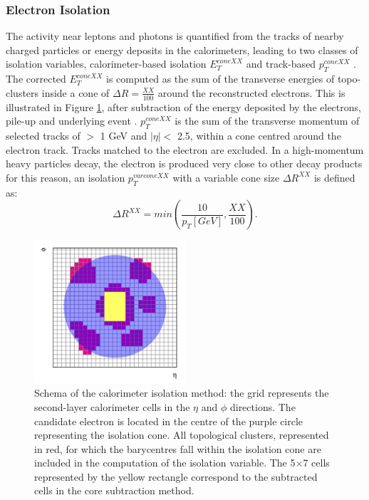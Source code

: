 \subsubsection{Electron Isolation}
\label{chap2:Objects:Egamma:EIso}
The activity near leptons and photons is quantified from the tracks of nearby charged particles or energy deposits in the calorimeters, leading to two classes of isolation variables, calorimeter-based isolation $E^{coneXX}_{T}$ and track-based $p_T^{coneXX}$ \cite{Electron_Reco_Id_Run1}. The corrected $E^{coneXX}_{T}$ is computed as the sum of the transverse energies of topo-clusters inside a cone of $\Delta R = \frac{XX}{100}$ around the reconstructed electrons. This is illustrated in Figure \ref{fig:chap2:Objects:Egamma:EIso:Schema}, after subtraction of the energy deposited by the electrons, pile-up and underlying event \cite{pile-up_IsoExtract}. $p_T^{coneXX}$ is the sum of the transverse momentum of selected tracks of \pT $>$ 1 GeV and $|\eta|<$ 2.5, within a cone centred around the electron track. Tracks matched to the electron are excluded. In a high-momentum heavy particles decay, the electron is produced very close to other decay products for this reason, an isolation $p_T^{varconeXX}$ with a variable cone size $\Delta R^{XX}$ is defined as:
\begin{equation}
    \Delta R^{XX} = min(\frac{10}{p_T[GeV]}, \frac{XX}{100}).
\end{equation}
\begin{figure}[htbp]
    \centering
    \includegraphics[width=0.5\textwidth]{Ch2/Img/Iso_Schema.png}
    \caption{Schema of the calorimeter isolation method: the grid represents the second-layer calorimeter cells in the $\eta$ and $\phi$ directions. The candidate electron is located in the centre of the purple circle representing the isolation cone. All topological clusters, represented in red, for which the barycentres fall within the isolation cone are included in the computation of the isolation variable. The 5$\times$7 cells represented by the yellow rectangle correspond to the subtracted cells in the core subtraction method.}
    \label{fig:chap2:Objects:Egamma:EIso:Schema}
\end{figure}
